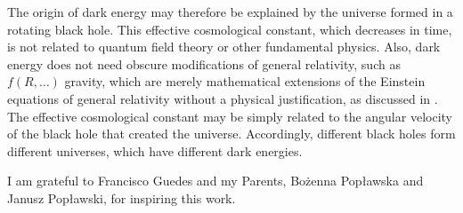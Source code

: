 \documentclass[prd,onecolumn,nofootinbib]{revtex4}
\begin{document}
The origin of dark energy may therefore be explained by the universe formed in a rotating black hole.
This effective cosmological constant, which decreases in time, is not related to quantum field theory or other fundamental physics.
Also, dark energy does not need obscure modifications of general relativity, such as $f(R,\dots)$ gravity, which are merely mathematical extensions of the Einstein equations of general relativity without a physical justification, as discussed in \cite{Sabine}.
The effective cosmological constant may be simply related to the angular velocity of the black hole that created the universe.
Accordingly, different black holes form different universes, which have different dark energies.

I am grateful to Francisco Guedes and my Parents, Bo\.{z}enna Pop{\l}awska and Janusz Pop{\l}awski, for inspiring this work.
\end{document}
